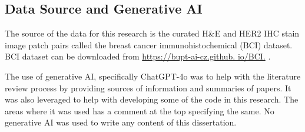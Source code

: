 
\begin{dedication} %


\section{Data Source and Generative AI}

The source of the data for this research is the curated H\&E and HER2 IHC stain image patch pairs called the breast cancer immunohistochemical (BCI) dataset. BCI dataset can be downloaded from \href{https://bupt-ai-cz.github. io/BCI.}{https://bupt-ai-cz.github. io/BCI.} \parencite{Liu2022BCI:Pix2pix}. 

The use of generative AI, specifically ChatGPT-4o was to help with the literature review process by providing sources of information and summaries of papers. It was also leveraged to help with developing some of the code in this research. The areas where it was used has a comment at the top specifying the same. No generative AI was used to write any content of this dissertation. 

\end{dedication}

